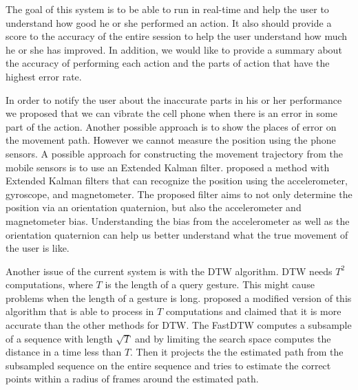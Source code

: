 The goal of this system is to be able to run in real-time and help the user to understand how good he or she performed an action. It also should provide a score to the accuracy of the entire session to help the user understand how much he or she has improved. In addition, we would like to provide a summary about the accuracy of performing each action and the parts of action that have the highest error rate.

In order to notify the user about the inaccurate parts in his or her performance we proposed that we can vibrate the cell phone when there is an error in some part of the action. Another possible approach is to show the places of error on the movement path. However we cannot measure the position using the phone sensors. A possible approach for constructing the movement trajectory from the mobile sensors is to use an Extended Kalman filter. \cite{sabatini2006quaternion} proposed a method with Extended Kalman filters that can recognize the position using the accelerometer, gyroscope, and magnetometer. The proposed filter aims to not only determine the position via an orientation quaternion, but also the accelerometer and magnetometer bias. Understanding the bias from the accelerometer as well as the orientation quaternion can help us better understand what the true movement of the user is like.

Another issue of the current system is with the DTW algorithm. DTW needs $T^2$ computations, where $T$ is the length of a query gesture. This might cause problems when the length of a gesture is long. \cite{salvador2007toward} proposed a modified version of this algorithm that is able to process in $T$ computations and claimed that it is more accurate than the other methods for DTW. The FastDTW computes a subsample of a sequence with length $\sqrt{T}$ and by limiting the search space computes the distance in a time less than $T$. Then it projects the the estimated path from the subsampled sequence on the entire sequence and tries to estimate the correct points within a radius of frames around the estimated path.


